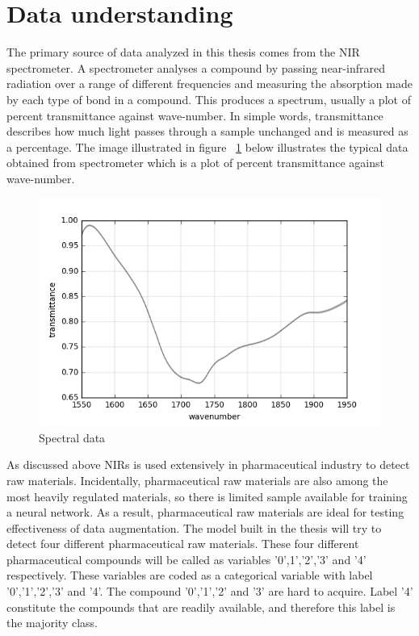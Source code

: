 \section{Data understanding}
The primary source of data analyzed in this thesis comes from the NIR spectrometer. A spectrometer analyses a compound by passing near-infrared radiation over a range of different frequencies and measuring the absorption made by each type of bond in a compound. This produces a spectrum, usually a plot of percent transmittance against wave-number. In simple words, transmittance describes how much light passes through a sample unchanged and is measured as a percentage. The image illustrated in figure ~\ref{fig:Spectral data} below illustrates the typical data obtained from spectrometer which is a plot of percent transmittance against wave-number.

\begin{figure}[ht]
	\begin{center}
		\includegraphics[width=\textwidth]{images/spectral_graph.png}
		\caption{Spectral data}
		\label{fig:Spectral data}
	\end{center}
\end{figure}


As discussed above NIRs is used extensively in pharmaceutical industry to detect raw materials. Incidentally, pharmaceutical raw materials are also among the most heavily regulated materials, so there is limited sample available for training a neural network. As a result, pharmaceutical raw materials are ideal for testing effectiveness of data augmentation. The model built in the thesis will try to detect four different pharmaceutical raw materials. These four different pharmaceutical compounds will be called as variables '0',1','2','3' and '4' respectively. These variables are coded as a categorical variable with label '0','1','2','3' and '4'. The compound '0','1','2' and '3' are hard to acquire. Label '4' constitute the compounds that are readily available, and therefore this label is the majority class.

